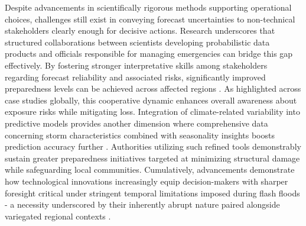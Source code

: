 Despite advancements in scientifically rigorous methods supporting operational choices, challenges still exist in conveying forecast uncertainties to non-technical stakeholders clearly enough for decisive actions. Research underscores that structured collaborations between scientists developing probabilistic data products and officials responsible for managing emergencies can bridge this gap effectively. By fostering stronger interpretative skills among stakeholders regarding forecast reliability and associated risks, significantly improved preparedness levels can be achieved across affected regions \citep{Martinaitis2023}. As highlighted across case studies globally, this cooperative dynamic enhances overall awareness about exposure risks while mitigating loss.
Integration of climate-related variability into predictive models provides another dimension where comprehensive data concerning storm characteristics combined with seasonality insights boosts prediction accuracy further \citep{Kuksina2020}. Authorities utilizing such refined tools demonstrably sustain greater preparedness initiatives targeted at minimizing structural damage while safeguarding local communities.
Cumulatively, advancements demonstrate how technological innovations increasingly equip decision-makers with sharper foresight critical under stringent temporal limitations imposed during flash floods - a necessity underscored by their inherently abrupt nature paired alongside variegated regional contexts \citep{Maqtan2022a}\citep{Laudan2020}.

